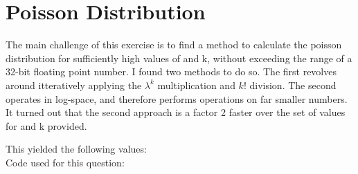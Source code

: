 \section{Poisson Distribution}

The main challenge of this exercise is to find a method to calculate the 
poisson distribution for sufficiently high values of \lambda and k, without 
exceeding the range of a 32-bit floating point number.
I found two methods to do so. The first revolves around itteratively applying
the $\lambda^k$ multiplication and $k!$ division. The second operates in
log-space, and therefore performs operations on far smaller numbers.
It turned out that the second approach is a factor 2 faster over the set of
values for \lambda and k provided.



This yielded the following values:\\


Code used for this question:



